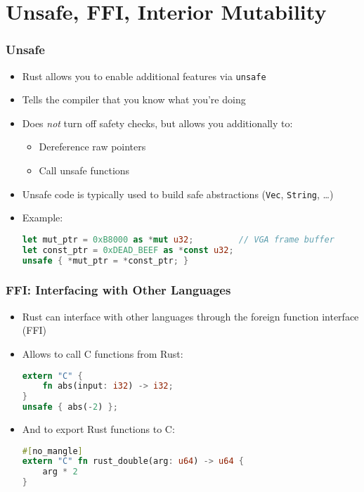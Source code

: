 \section{Unsafe, FFI, Interior Mutability}

\begin{frame}[fragile]
    \frametitle{Unsafe}

    \begin{itemize}
        \item Rust allows you to enable additional features via \texttt{unsafe}
        \item Tells the compiler that you know what you're doing
        \item Does \emph{not} turn off safety checks, but allows you additionally to:
        \begin{itemize}
            \item Dereference raw pointers
            \item Call unsafe functions
        \end{itemize}
        \item Unsafe code is typically used to build safe abstractions (\texttt{Vec}, \texttt{String}, \dots)
        \item Example:
        \begin{lstlisting}[language=rust]
let mut_ptr = 0xB8000 as *mut u32;         // VGA frame buffer
let const_ptr = 0xDEAD_BEEF as *const u32;
unsafe { *mut_ptr = *const_ptr; }
        \end{lstlisting}
    \end{itemize}
\end{frame}

\begin{frame}[fragile]
    \frametitle{FFI: Interfacing with Other Languages}

    \begin{itemize}
        \item Rust can interface with other languages through the foreign function interface (FFI)
        \item Allows to call C functions from Rust:
        \begin{lstlisting}[language=rust]
extern "C" {
    fn abs(input: i32) -> i32;
}
unsafe { abs(-2) };
        \end{lstlisting}

        \pause

        \item And to export Rust functions to C:
        \begin{lstlisting}[language=rust]
#[no_mangle]
extern "C" fn rust_double(arg: u64) -> u64 {
    arg * 2
}
        \end{lstlisting}
    \end{itemize}
\end{frame}

